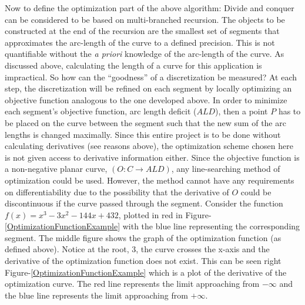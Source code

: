 Now to define the optimization part of the above algorithm:  Divide and 
conquer can be considered to be based on multi-branched recursion.  The 
objects to be constructed at the end of the recursion are the smallest set 
of segments that approximates the arc-length of the curve to a defined 
precision.  This is not quantifiable without the {\it{a priori}} knowledge 
of the arc-length of the curve.  As discussed above, calculating the 
length of a curve for this application is impractical.  So how can the 
``goodness'' of a discretization be measured?  At each step, the 
discretization will be refined on each segment by locally optimizing an 
objective function analogous to the one developed above.  In order to 
minimize each segment’s objective function, arc length deficit ($ALD$), 
then a point $P$ has to be placed on the curve between the segment such 
that the new sum of the arc lengths is changed maximally.  Since this 
entire project is to be done without calculating derivatives (see reasons above), the optimization scheme chosen here is not given access to derivative information either.  Since the objective function is a non-negative planar curve, $(O: C \rightarrow ALD)$, any line-searching method of optimization could be used.  However, the method cannot have any requirements on differentiability due to the possibility that the derivative of $O$ could be discontinuous if the curve passed through the segment.  Consider the function $f(x)=x^3-3x^2-144x+432$, plotted in red in Figure-\ref{OptimizationFunctionExample} with the blue line representing the corresponding segment.  The middle figure shows the graph of the optimization function (as defined above).  Notice at the root, 3, the curve crosses the x-axis and the derivative of the optimization function does not exist.  This can be seen right Figure-\ref{OptimizationFunctionExample} which is a plot of the derivative of the optimization curve.  The red line represents the limit approaching from $-\infty$ and the blue line represents the limit approaching from $+\infty$.

